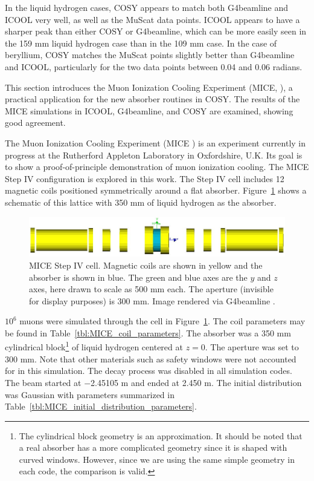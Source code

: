In the liquid hydrogen cases, COSY appears to match both G4beamline and ICOOL very well, as well as the MuScat data points. ICOOL appears to have a sharper peak than either COSY or G4beamline, which can be more easily seen in the 159 mm liquid hydrogen case than in the 109 mm case. In the case of beryllium, COSY matches the MuScat points slightly better than G4beamline and ICOOL, particularly for the two data points between 0.04 and 0.06 radians.

\label{sec:mice}

This section introduces the Muon Ionization Cooling Experiment (MICE, \cite{mice}), a practical application for the new absorber routines in COSY. The results of the MICE simulations in ICOOL, G4beamline, and COSY are examined, showing good agreement.

\label{ssc:miceIntro}
The Muon Ionization Cooling Experiment (MICE \cite{mice}) is an experiment currently in progress at the Rutherford Appleton Laboratory in Oxfordshire, U.K. Its goal is to show a proof-of-principle demonstration of muon ionization cooling. The MICE Step IV configuration is explored in this work. The Step IV cell includes 12 magnetic coils positioned symmetrically around a flat absorber. Figure~\ref{fig:miceStepIV} shows a schematic of this lattice with 350 mm of liquid hydrogen as the absorber.
\begin{figure}[h!]
  \centering
    \includegraphics[width=\textwidth]{Figures/miceStepIV} 
  \caption[MICE Step IV cell.]{MICE Step IV cell. Magnetic coils are shown in yellow and the absorber is shown in blue. The green and blue axes are the $y$ and $z$ axes, here drawn to scale as 500 mm each. The aperture (invisible for display purposes) is 300 mm. Image rendered via G4beamline \cite{g4bl}.}
  \label{fig:miceStepIV}
\end{figure}

\label{ssc:miceResults}
$10^6$ muons were simulated through the cell in Figure~\ref{fig:miceStepIV}. The coil parameters may be found in Table~\ref{tbl:MICE_coil_parameters}. The absorber was a 350 mm cylindrical block\footnote{The cylindrical block geometry is an approximation. It should be noted that a real absorber has a more complicated geometry since it is shaped with curved windows. However, since we are using the same simple geometry in each code, the comparison is valid.} of liquid hydrogen centered at $z=0$. The aperture was set to 300 mm. Note that other materials such as safety windows were not accounted for in this simulation. The decay process was disabled in all simulation codes. The beam started at $-$2.45105 m and ended at 2.450 m. The initial distribution was Gaussian with parameters summarized in Table~\ref{tbl:MICE_initial_distribution_parameters}.

